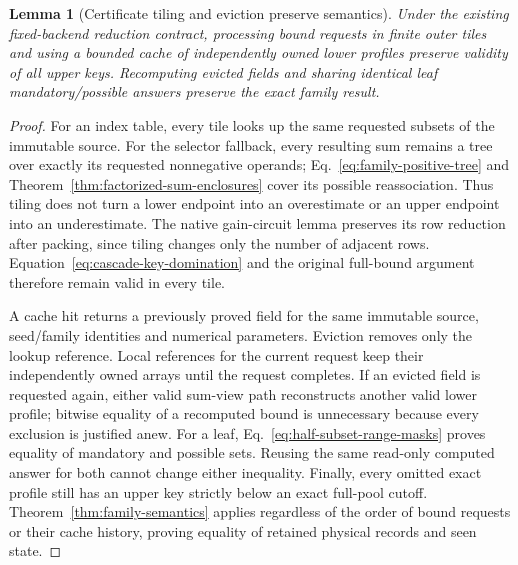 \documentclass[11pt]{article}
\newtheorem{lemma}{Lemma}
\begin{document}
\begin{lemma}[Certificate tiling and eviction preserve semantics]\label{lem:certificate-tiling}
Under the existing fixed-backend reduction contract, processing bound requests in finite outer tiles and using a bounded cache of independently owned lower profiles preserve validity of all upper keys. Recomputing evicted fields and sharing identical leaf mandatory/possible answers preserve the exact family result.
\end{lemma}
\begin{proof}
For an index table, every tile looks up the same requested subsets of the immutable source. For the selector fallback, every resulting sum remains a tree over exactly its requested nonnegative operands; Eq.~\eqref{eq:family-positive-tree} and Theorem~\ref{thm:factorized-sum-enclosures} cover its possible reassociation. Thus tiling does not turn a lower endpoint into an overestimate or an upper endpoint into an underestimate. The native gain-circuit lemma preserves its row reduction after packing, since tiling changes only the number of adjacent rows. Equation~\eqref{eq:cascade-key-domination} and the original full-bound argument therefore remain valid in every tile.

A cache hit returns a previously proved field for the same immutable source, seed/family identities and numerical parameters. Eviction removes only the lookup reference. Local references for the current request keep their independently owned arrays until the request completes. If an evicted field is requested again, either valid sum-view path reconstructs another valid lower profile; bitwise equality of a recomputed bound is unnecessary because every exclusion is justified anew. For a leaf, Eq.~\eqref{eq:half-subset-range-masks} proves equality of mandatory and possible sets. Reusing the same read-only computed answer for both cannot change either inequality. Finally, every omitted exact profile still has an upper key strictly below an exact full-pool cutoff. Theorem~\ref{thm:family-semantics} applies regardless of the order of bound requests or their cache history, proving equality of retained physical records and seen state.
\end{proof}
\end{document}
